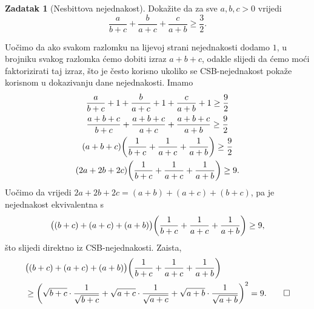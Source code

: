 \documentclass{book}
\let\originalleft\left
\let\originalright\right
\renewcommand{\left}{\mathopen{}\mathclose\bgroup\originalleft}
\renewcommand{\right}{\aftergroup\egroup\originalright}
\renewenvironment{proof}{%
    \vspace{-\parskip}\begin{oldproof}%
    }{%
    \end{oldproof}%
}
\theoremstyle{definition}
\theoremstyle{definition}
\newtheorem{exercise}{Zadatak}
\theoremstyle{remark}
\begin{document}
\begin{exercise}[Nesbittova nejednakost]
Dokažite da za sve $a, b, c>0$ vrijedi
$$\dfrac{a}{b+c}+\dfrac{b}{a+c}+\dfrac{c}{a+b}\geq \dfrac{3}{2}.$$
\end{exercise}
\begin{proof}[Rješenje]
Uočimo da ako svakom razlomku na lijevoj strani nejednakosti dodamo $1$, u brojniku svakog razlomka ćemo dobiti izraz $a+b+c$, odakle slijedi da ćemo moći faktorizirati taj izraz, što je često korisno ukoliko se CSB-nejednakost pokaže korisnom u dokazivanju dane nejednakosti. Imamo
\begin{gather*}
\dfrac{a}{b+c}+1+\dfrac{b}{a+c}+1+\dfrac{c}{a+b}+1\geq \dfrac{9}{2}\\
\dfrac{a+b+c}{b+c}+\dfrac{a+b+c}{a+c}+\dfrac{a+b+c}{a+b}\geq \dfrac{9}{2}\\
(a+b+c)\left(\dfrac{1}{b+c}+\dfrac{1}{a+c}+\dfrac{1}{a+b}\right)\geq \dfrac{9}{2}\\
(2a+2b+2c)\left(\dfrac{1}{b+c}+\dfrac{1}{a+c}+\dfrac{1}{a+b}\right)\geq 9.
\end{gather*}
Uočimo da vrijedi $2a+2b+2c=(a+b)+(a+c)+(b+c)$, pa je nejednakost ekvivalentna s
$$\left((b+c)+(a+c)+(a+b)\right)\left(\dfrac{1}{b+c}+\dfrac{1}{a+c}+\dfrac{1}{a+b}\right)\geq 9,$$
što slijedi direktno iz CSB-nejednakosti. Zaista,
\begin{align*}
&\left((b+c)+(a+c)+(a+b)\right)\left(\dfrac{1}{b+c}+\dfrac{1}{a+c}+\dfrac{1}{a+b}\right)\\ &\geq\left(\sqrt{b+c}\cdot \dfrac{1}{\sqrt{b+c}}+\sqrt{a+c}\cdot \dfrac{1}{\sqrt{a+c}}+\sqrt{a+b}\cdot \dfrac{1}{\sqrt{a+b}}\right)^2=9. \qedhere
\end{align*}
\end{proof}
\end{document}
